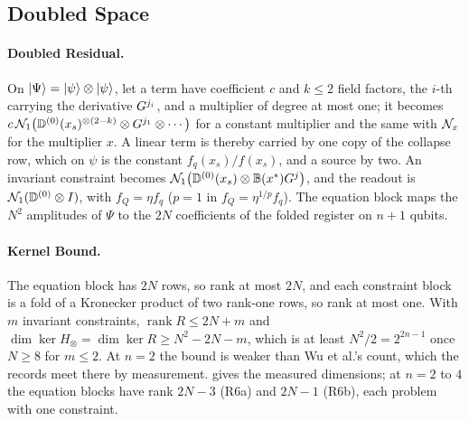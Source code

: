 \subsection{Doubled Space}
\label{app:doubled-space}

\paragraph{Doubled Residual.} On $\ket{\Psi}=\ket{\psi}\otimes\ket{\psi}$, let a term have coefficient $c$ and $k\le2$ field factors, the $i$-th carrying the derivative $G^{j_i}$, and a multiplier of degree at most one; it becomes $c\,\mathcal{N}_1\bigl(\mathbb{D}^{(0)}(x_s)^{\otimes(2-k)}\otimes G^{j_1}\otimes\cdots\bigr)$ for a constant multiplier and the same with $\mathcal{N}_x$ for the multiplier $x$. A linear term is thereby carried by one copy of the collapse row, which on $\psi$ is the constant $f_q(x_s)/f(x_s)$, and a source by two. An invariant constraint becomes $\mathcal{N}_1\bigl(\mathbb{D}^{(0)}(x_s)\otimes\mathbb{B}(x^*)G^j\bigr)$, and the readout is $\mathcal{N}_1(\mathbb{D}^{(0)}\otimes I)$, with $f_Q=\eta f_q$ ($p=1$ in $f_Q=\eta^{1/p}f_q$). The equation block maps the $N^2$ amplitudes of $\Psi$ to the $2N$ coefficients of the folded register on $n+1$ qubits.

\paragraph{Kernel Bound.} The equation block has $2N$ rows, so rank at most $2N$, and each constraint block is a fold of a Kronecker product of two rank-one rows, so rank at most one. With $m$ invariant constraints, $\operatorname{rank}R\le2N+m$ and $\dim\ker H_\otimes=\dim\ker R\ge N^2-2N-m$, which is at least $N^2/2=2^{2n-1}$ once $N\ge8$ for $m\le2$. At $n=2$ the bound is weaker than Wu et al.'s count, which the records meet there by measurement.  gives the measured dimensions; at $n=2$ to $4$ the equation blocks have rank $2N-3$ (R6a) and $2N-1$ (R6b), each problem with one constraint.

